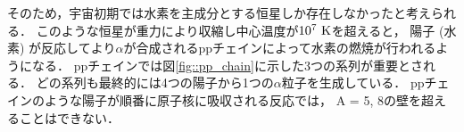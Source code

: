 \documentclass[../master]{subfiles}
\begin{document}
そのため，宇宙初期では水素を主成分とする恒星しか存在しなかったと考えられる．
このような恒星が重力により収縮し中心温度が$10^7~{\rm K}$を超えると，
陽子 (水素) が反応してより$\alpha$が合成されるppチェインによって水素の燃焼が行われるようになる．
ppチェインでは図\ref{fig::pp_chain}に示した3つの系列が重要とされる．
どの系列も最終的には4つの陽子から1つの$\alpha$粒子を生成している．
ppチェインのような陽子が順番に原子核に吸収される反応では，
A = 5, 8の壁を超えることはできない．
\end{document}
